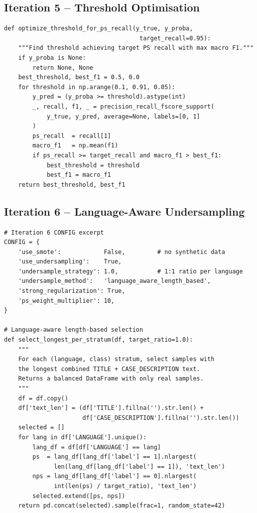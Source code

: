 \documentclass[11pt, titlepage, bibliography=totoc]{scrreprt}
\begin{document}
\subsection*{Iteration 5 -- Threshold Optimisation}

\begin{lstlisting}[label=lst:threshold-opt,
  caption={Threshold optimisation function targeting 95\,\% PS recall in Iteration~5.}]
def optimize_threshold_for_ps_recall(y_true, y_proba,
                                      target_recall=0.95):
    """Find threshold achieving target PS recall with max macro F1."""
    if y_proba is None:
        return None, None
    best_threshold, best_f1 = 0.5, 0.0
    for threshold in np.arange(0.1, 0.91, 0.05):
        y_pred = (y_proba >= threshold).astype(int)
        _, recall, f1, _ = precision_recall_fscore_support(
            y_true, y_pred, average=None, labels=[0, 1]
        )
        ps_recall  = recall[1]
        macro_f1   = np.mean(f1)
        if ps_recall >= target_recall and macro_f1 > best_f1:
            best_threshold = threshold
            best_f1 = macro_f1
    return best_threshold, best_f1
\end{lstlisting}

\subsection*{Iteration 6 -- Language-Aware Undersampling}

\begin{lstlisting}[label=lst:lang-undersample,
  caption={Language-aware undersampling strategy in Iteration~6: selects the longest incident descriptions within each language--class stratum to preserve language balance.}]
# Iteration 6 CONFIG excerpt
CONFIG = {
    'use_smote':            False,         # no synthetic data
    'use_undersampling':    True,
    'undersample_strategy': 1.0,           # 1:1 ratio per language
    'undersample_method':   'language_aware_length_based',
    'strong_regularization': True,
    'ps_weight_multiplier': 10,
}

# Language-aware length-based selection
def select_longest_per_stratum(df, target_ratio=1.0):
    """
    For each (language, class) stratum, select samples with
    the longest combined TITLE + CASE_DESCRIPTION text.
    Returns a balanced DataFrame with only real samples.
    """
    df = df.copy()
    df['text_len'] = (df['TITLE'].fillna('').str.len() +
                      df['CASE_DESCRIPTION'].fillna('').str.len())
    selected = []
    for lang in df['LANGUAGE'].unique():
        lang_df = df[df['LANGUAGE'] == lang]
        ps  = lang_df[lang_df['label'] == 1].nlargest(
              len(lang_df[lang_df['label'] == 1]), 'text_len')
        nps = lang_df[lang_df['label'] == 0].nlargest(
              int(len(ps) / target_ratio), 'text_len')
        selected.extend([ps, nps])
    return pd.concat(selected).sample(frac=1, random_state=42)
\end{lstlisting}
\end{document}
